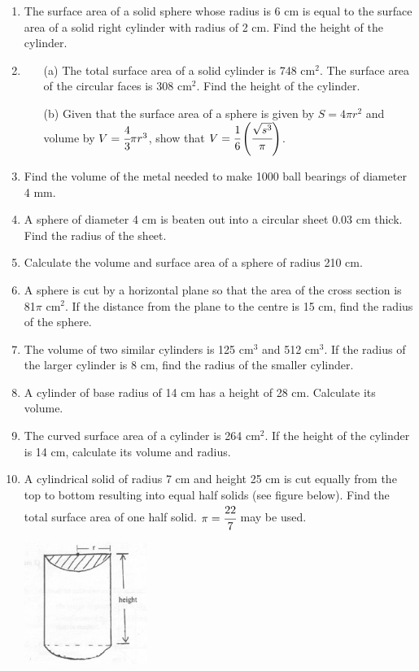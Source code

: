\begin{enumerate}
	\item The surface area of a solid sphere whose radius is 6 cm is equal to the surface area of a solid right cylinder with radius of 2 cm. Find the height of the cylinder.
	
	\item 
		\begin{itemize}
		\item[(a)] The total surface area of a solid cylinder is 748 cm$^2$. The surface area of the circular faces is 308 cm$^2$. Find the height of the cylinder.
		\item[(b)] Given that the surface area of a sphere is given by $S = 4\pi r^2$ and volume by $V = \cfrac{4}{3}\pi r^3$, show that $V = \cfrac{1}{6}\left(\cfrac{\sqrt{s^3}}{\pi}\right)$.
		\end{itemize}
		
	\item Find the volume of the metal needed to make 1000 ball bearings of diameter 4 mm.
	
	\item A sphere of diameter 4 cm is beaten out into a circular sheet 0.03 cm thick. Find the radius of the sheet.
	
	\item Calculate the volume and surface area of a sphere of radius 210 cm.
	
	\item A sphere is cut by a horizontal plane so that the area of the cross section is 81$\pi$ cm$^2$. If the distance from the plane to the centre is 15 cm, find the radius of the sphere.
	
	\item The volume of two similar cylinders is 125 cm$^3$ and 512 cm$^3$. If the radius of the larger cylinder is 8 cm, find the radius of the smaller cylinder.
	
	\item A cylinder of base radius of 14 cm has a height of 28 cm. Calculate its volume.
	
	\item The curved surface area of a cylinder is 264 cm$^2$. If the height of the cylinder is 14 cm, calculate its volume and radius.
	
	\item A cylindrical solid of radius 7 cm and height 25 cm is cut equally from the top to bottom resulting into equal half solids (see figure below). Find the total surface area of one half solid. $\pi = \cfrac{22}{7}$ may be used.
	\begin{center}
	\includegraphics[width=4cm]{./img/3d7.jpg}
	\end{center}


\end{enumerate}
